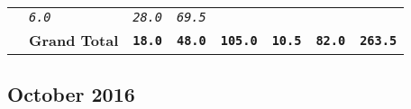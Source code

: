 \documentclass[11pt,A4paper,]{article}
\begin{document}
\begin{longtable}[]{@{}llrrrrrr@{}}
\begin{minipage}[t]{0.12\columnwidth}
\end{minipage} & \begin{minipage}[t]{0.12\columnwidth}\raggedleft\strut
\emph{\texttt{6.0}}\strut
\end{minipage} & \begin{minipage}[t]{0.12\columnwidth}\raggedleft\strut
\emph{\texttt{28.0}}\strut
\end{minipage} & \begin{minipage}[t]{0.12\columnwidth}\raggedleft\strut
\emph{\texttt{69.5}}\strut
\end{minipage}\tabularnewline
\begin{minipage}[t]{0.12\columnwidth}\raggedright\strut
\strut
\end{minipage} & \begin{minipage}[t]{0.12\columnwidth}\raggedright\strut
\textbf{Grand Total}\strut
\end{minipage} & \begin{minipage}[t]{0.12\columnwidth}\raggedleft\strut
\textbf{\texttt{18.0}}\strut
\end{minipage} & \begin{minipage}[t]{0.12\columnwidth}\raggedleft\strut
\textbf{\texttt{48.0}}\strut
\end{minipage} & \begin{minipage}[t]{0.12\columnwidth}\raggedleft\strut
\textbf{\texttt{105.0}}\strut
\end{minipage} & \begin{minipage}[t]{0.12\columnwidth}\raggedleft\strut
\textbf{\texttt{10.5}}\strut
\end{minipage} & \begin{minipage}[t]{0.12\columnwidth}\raggedleft\strut
\textbf{\texttt{82.0}}\strut
\end{minipage} & \begin{minipage}[t]{0.12\columnwidth}\raggedleft\strut
\textbf{\texttt{263.5}}\strut
\end{minipage}\tabularnewline
\bottomrule
\end{longtable}

\clearpage

\subsection{October 2016}\label{october-2016}
\end{document}
